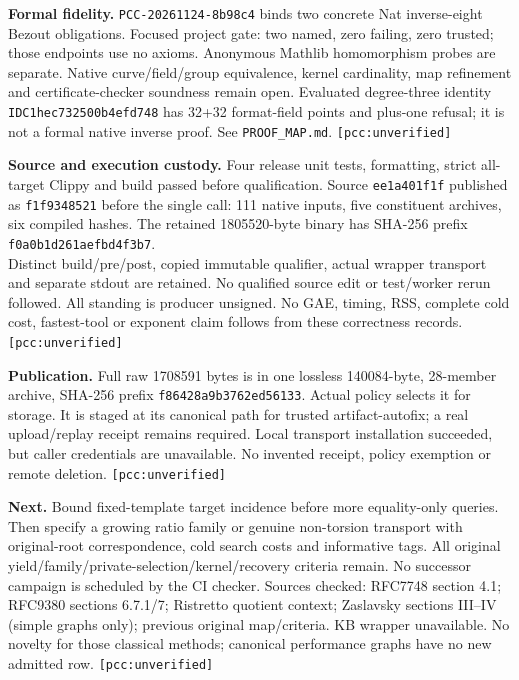 \documentclass[10pt]{article}
\begin{document}
\textbf{Formal fidelity.} \texttt{PCC-20261124-8b98c4} binds two concrete Nat
inverse-eight Bezout obligations. Focused project gate: two named, zero
failing, zero trusted; those endpoints use no axioms. Anonymous Mathlib
homomorphism probes are separate. Native curve/field/group equivalence,
kernel cardinality, map refinement and certificate-checker soundness remain
open. Evaluated degree-three identity \texttt{IDC1hec732500b4efd748} has 32+32
format-field points and plus-one refusal; it is not a formal native inverse
proof. See \texttt{PROOF\_MAP.md}. \texttt{[pcc:unverified]}

\textbf{Source and execution custody.} Four release unit tests, formatting,
strict all-target Clippy and build passed before qualification. Source
\texttt{ee1a401f1f} published as \texttt{f1f9348521} before the single call:
111 native inputs, five constituent archives, six compiled hashes.
The retained 1805520-byte binary has SHA-256 prefix
\texttt{f0a0b1d261aefbd4f3b7}.\\
Distinct build/pre/post, copied immutable
qualifier, actual wrapper transport and separate stdout are retained. No
qualified source edit or test/worker rerun followed. All standing is producer
unsigned. No GAE, timing, RSS, complete cold cost, fastest-tool or exponent
claim follows from these correctness records. \texttt{[pcc:unverified]}

\textbf{Publication.} Full raw 1708591 bytes is in one lossless 140084-byte,
28-member archive, SHA-256 prefix \texttt{f86428a9b3762ed56133}. Actual policy
selects it for storage. It is staged at its canonical path for trusted
artifact-autofix; a real upload/replay receipt remains required. Local
transport installation succeeded, but caller credentials are unavailable.
No invented receipt, policy exemption or remote deletion.
\texttt{[pcc:unverified]}

\textbf{Next.} Bound fixed-template target incidence before more equality-only
queries. Then specify a growing ratio family or genuine non-torsion transport
with original-root correspondence, cold search costs and informative tags.
All original yield/family/private-selection/kernel/recovery criteria remain.
No successor campaign is scheduled by the CI checker. Sources checked:
RFC7748 section 4.1; RFC9380 sections 6.7.1/7; Ristretto quotient context;
Zaslavsky sections III--IV (simple graphs only); previous original map/criteria.
KB wrapper unavailable. No novelty for those classical methods; canonical
performance graphs have no new admitted row. \texttt{[pcc:unverified]}
\end{document}
